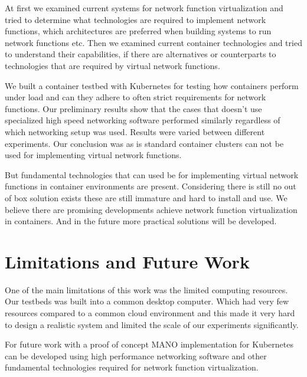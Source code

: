 \documentclass[12pt,oneandhalf,chaparabic,ceng,ms,eng,oneside,pntc]{gsufbe}
\begin{document}
At first we examined current systems for network function virtualization and tried to determine what
technologies are required to implement network functions, which architectures are preferred when
building systems to run network functions etc. Then we examined current container technologies and
tried to understand their capabilities, if there are alternatives or counterparts to technologies that
are required by virtual network functions.

We built a container testbed with Kubernetes for testing how containers perform under load and can they
adhere to often strict requirements for network functions. Our preliminary results show that the cases
that doesn't use specialized high speed networking software performed similarly regardless of which
networking setup was used. Results were varied between different experiments. Our conclusion was as is
standard container clusters can not be used for implementing virtual network functions.

But fundamental technologies that can used be for implementing virtual network functions in
container environments are present. Considering there is still no out of box solution exists these are
still immature and hard to install and use. We believe there are promising developments achieve network
function virtualization in containers. And in the future more practical solutions will be developed.

\section{Limitations and Future Work}
One of the main limitations of this work was the limited computing resources. Our testbeds was 
built into a common desktop computer. Which had very few resources compared to a common cloud
environment and this made it very hard to design a realistic system and limited the scale of our
experiments significantly.

For future work with a proof of concept MANO implementation for Kubernetes can be developed using high
performance networking software and other fundamental technologies required for network function
virtualization.

\appendix
\thispagestyle{empty}

%
\end{document}
